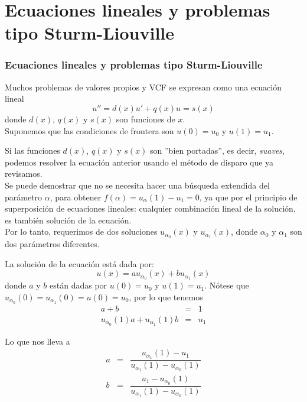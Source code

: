 \section{Ecuaciones lineales y problemas tipo Sturm-Liouville}
\begin{frame}
\frametitle{Ecuaciones lineales y problemas tipo Sturm-Liouville}
Muchos problemas de valores propios y VCF se expresan como una ecuación lineal
\begin{equation}
u'' = d(x) u' + q(x) u = s(x)
\end{equation}
donde $d(x)$, $q(x)$ y $s(x)$ son funciones de $x$.
\\
\medskip
Suponemos que las condiciones de frontera son $u(0)=u_{0}$ y $u(1)=u_{1}$.
\end{frame}
\begin{frame}
Si las funciones $d(x)$, $q(x)$ y $s(x)$ son ''bien portadas'', es decir, \emph{suaves}, podemos resolver la ecuación anterior usando el método de disparo que ya revisamos.
\\
\medskip
Se puede demostrar que no se necesita  hacer una búsqueda extendida del parámetro $\alpha$, para obtener $f(\alpha) = u_{\alpha}(1) - u_{1} = 0$, ya que por el principio de superposición de ecuaciones lineales: cualquier combinación lineal de la solución, es también solución de la ecuación.
\\
\medskip
Por lo tanto, requerimos de dos soluciones $u_{\alpha_{0}}(x)$ y $u_{\alpha_{1}}(x)$, donde $\alpha_{0}$ y $\alpha_{1}$ son dos parámetros diferentes.
\end{frame}
\begin{frame}
La solución de la ecuación está dada por:
\begin{equation}
u(x) = a u_{\alpha_{0}}(x) + b u_{\alpha_{1}}(x)
\end{equation}
donde $a$ y $b$ están dadas por $u(0)= u_{0}$ y $u(1) = u_{1}$. Nótese que $u_{\alpha_{0}}(0)=u_{\alpha_{1}}(0) = u(0) = u_{0}$, por lo que tenemos
\begin{eqnarray}
a + b &=& 1 \\
u_{\alpha_{0}}(1) a + u_{\alpha_{1}} (1) b &=& u_{1}
\end{eqnarray}
\end{frame}
\begin{frame}
Lo que nos lleva a
\begin{eqnarray}
a &=& \dfrac{u_{\alpha_{1}} (1) - u_{1}}{u_{\alpha_{1}} (1)-u_{\alpha_{0}} (1)} \\
b &=& \dfrac{ u_{1}- u_{\alpha_{0}} (1)}{u_{\alpha_{1}} (1)-u_{\alpha_{0}} (1)}
\end{eqnarray}
\end{frame}
